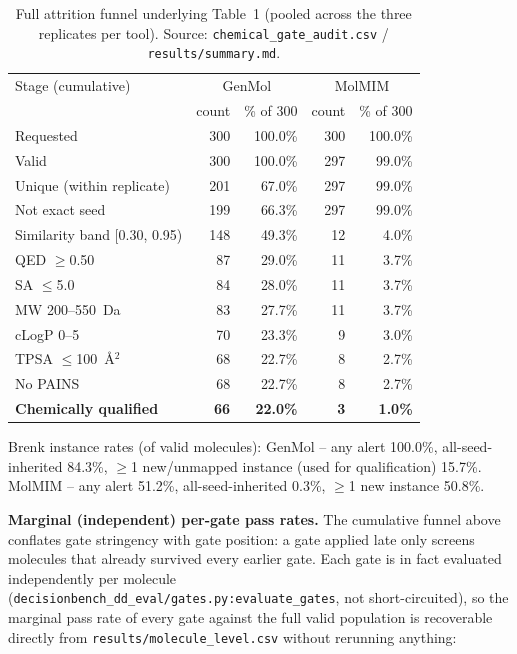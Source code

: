 \documentclass{article}
\begin{document}
\begin{table}[h]
\centering
\footnotesize
\begin{tabular}{lrrrr}
\toprule
Stage (cumulative) & \multicolumn{2}{c}{GenMol} & \multicolumn{2}{c}{MolMIM} \\
 & count & \% of 300 & count & \% of 300 \\
\midrule
Requested & 300 & 100.0\% & 300 & 100.0\% \\
Valid & 300 & 100.0\% & 297 & 99.0\% \\
Unique (within replicate) & 201 & 67.0\% & 297 & 99.0\% \\
Not exact seed & 199 & 66.3\% & 297 & 99.0\% \\
Similarity band [0.30, 0.95) & 148 & 49.3\% & 12 & 4.0\% \\
QED $\geq$0.50 & 87 & 29.0\% & 11 & 3.7\% \\
SA $\leq$5.0 & 84 & 28.0\% & 11 & 3.7\% \\
MW 200--550~Da & 83 & 27.7\% & 11 & 3.7\% \\
cLogP 0--5 & 70 & 23.3\% & 9 & 3.0\% \\
TPSA $\leq$100~\AA$^2$ & 68 & 22.7\% & 8 & 2.7\% \\
No PAINS & 68 & 22.7\% & 8 & 2.7\% \\
\textbf{Chemically qualified} & \textbf{66} & \textbf{22.0\%} & \textbf{3} & \textbf{1.0\%} \\
\bottomrule
\end{tabular}
\caption{Full attrition funnel underlying Table~1 (pooled across the three replicates per tool). Source: \texttt{chemical\_gate\_audit.csv} / \texttt{results/summary.md}.}
\label{tab:attrition-funnel}
\end{table}

Brenk instance rates (of valid molecules): GenMol -- any alert 100.0\%, all-seed-inherited 84.3\%, $\geq$1 new/unmapped instance (used for qualification) 15.7\%. MolMIM -- any alert 51.2\%, all-seed-inherited 0.3\%, $\geq$1 new instance 50.8\%.

\textbf{Marginal (independent) per-gate pass rates.} The cumulative funnel above conflates gate stringency with gate position: a gate applied late only screens molecules that already survived every earlier gate. Each gate is in fact evaluated independently per molecule (\texttt{decisionbench\_dd\_eval/gates.py:evaluate\_gates}, not short-circuited), so the marginal pass rate of every gate against the full valid population is recoverable directly from \texttt{results/molecule\_level.csv} without rerunning anything:
\end{document}

